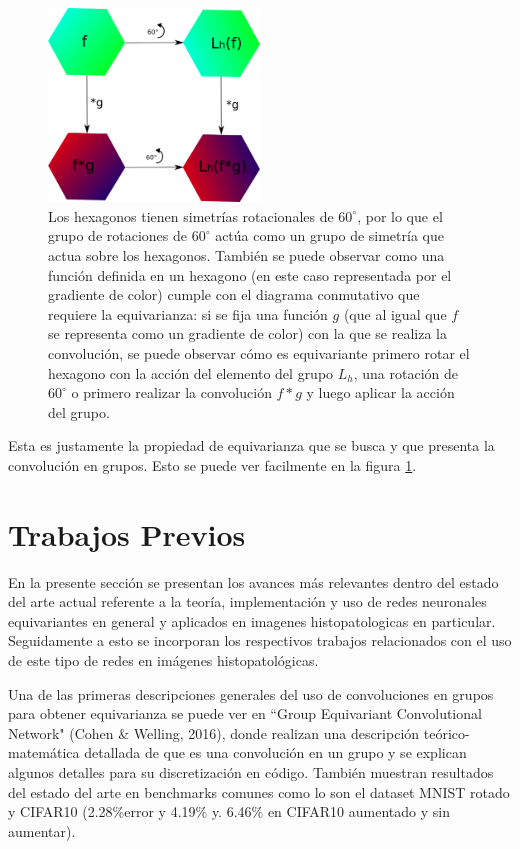 \documentclass[12pt,letterpaper,final, openany]{scrbook}
\begin{document}
\begin{figure}[h!]
    \centering
    \includegraphics[width=0.5\textwidth]{hexagono.png}
    \caption{Los hexagonos tienen simetrías rotacionales de $60^{\circ}$, por lo que el grupo de rotaciones de $60^{\circ}$ actúa como un grupo de simetría que actua sobre los hexagonos. También se puede observar como una función definida en un hexagono (en este caso representada por el gradiente de color) cumple con el diagrama conmutativo que requiere la equivarianza: si se fija una función $g$ (que al igual que $f$ se representa como un gradiente de color) con la que se realiza la convolución, se puede observar cómo es equivariante primero rotar el hexagono con la acción del elemento del grupo $L_{h}$, una rotación de $60^{\circ}$ o primero realizar la convolución $f*g$ y luego aplicar la acción del grupo.}
    \label{fig:convdiagram}
\end{figure}

Esta es justamente la propiedad de equivarianza que se busca y que presenta la convolución en grupos. Esto se puede ver facilmente en la figura \ref{fig:convdiagram}.



\section{Trabajos Previos}


En la presente sección se presentan los avances más relevantes dentro del estado del arte actual referente a la teoría, implementación y uso de redes neuronales equivariantes en general y aplicados en imagenes histopatologicas en particular. Seguidamente a esto se incorporan los respectivos trabajos relacionados con el uso de este tipo de redes en imágenes histopatológicas.

Una de las primeras descripciones generales del uso de convoluciones en grupos para obtener equivarianza se puede ver en ``Group Equivariant Convolutional Network" (Cohen \& Welling, 2016),  donde realizan una descripción teórico-matemática detallada de que es una convolución en un grupo y se explican algunos detalles para su discretización en código. También muestran resultados del estado del arte en benchmarks comunes como lo son el dataset MNIST rotado y CIFAR10 (2.28\%error y 4.19\% y. 6.46\% en CIFAR10 aumentado y sin aumentar).
\end{document}
